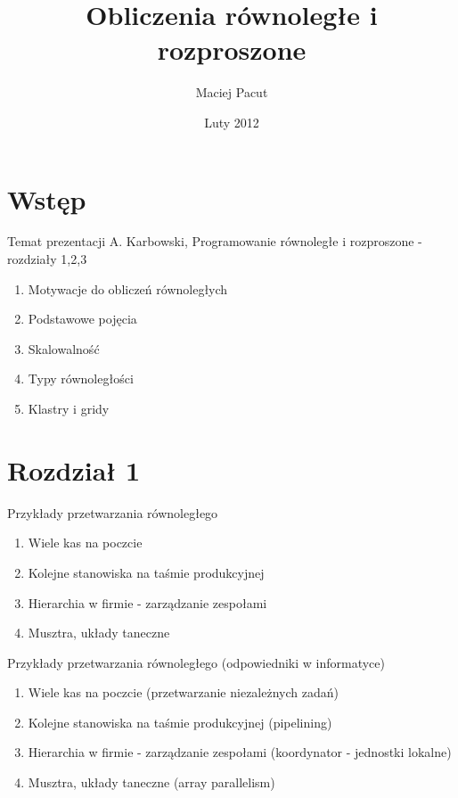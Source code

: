 \documentclass{beamer}
\title{Obliczenia równoległe i rozproszone}
\author{Maciej Pacut}
\date{Luty 2012}
\begin{document}
\begin{frame}
  \titlepage
\end{frame}

\section{Wstęp}
\begin{frame}{Temat prezentacji}
  A. Karbowski, Programowanie równoległe i rozproszone - rozdziały 1,2,3
  \begin{enumerate}
  \item Motywacje do obliczeń równoległych
  \item Podstawowe pojęcia
  \item Skalowalność
  \item Typy równoległości
  \item Klastry i gridy
  \end{enumerate}
\end{frame}
\section{Rozdział 1}

\begin{frame}{Przykłady przetwarzania równoległego}
  \begin{enumerate}
  \item Wiele kas na poczcie
  \item Kolejne stanowiska na taśmie produkcyjnej
  \item Hierarchia w firmie - zarządzanie zespołami
  \item Musztra, układy taneczne
  \end{enumerate}
\end{frame}

\begin{frame}{Przykłady przetwarzania równoległego (odpowiedniki w informatyce)}
  \begin{enumerate}
  \item Wiele kas na poczcie (przetwarzanie niezależnych zadań)
  \item Kolejne stanowiska na taśmie produkcyjnej (pipelining)
  \item Hierarchia w firmie - zarządzanie zespołami (koordynator - jednostki lokalne)
  \item Musztra, układy taneczne (array parallelism)
  \end{enumerate}
\end{frame}
\end{document}
